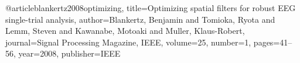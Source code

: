 \begin{thebibliography}{99} %
 
@article{blankertz2008optimizing,
	title={Optimizing spatial filters for robust EEG single-trial analysis},
	author={Blankertz, Benjamin and Tomioka, Ryota and Lemm, Steven and Kawanabe, Motoaki and Muller, Klaus-Robert},
	journal={Signal Processing Magazine, IEEE},
	volume={25},
	number={1},
	pages={41--56},
	year={2008},
	publisher={IEEE}
}
\end{thebibliography}